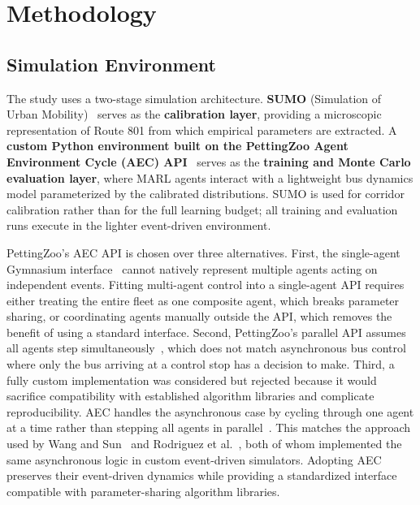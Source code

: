 \section{Methodology}

\subsection{Simulation Environment}

The study uses a two-stage simulation architecture. \textbf{SUMO} (Simulation of Urban Mobility)~\cite{Lopez2018SUMO} serves as the \textbf{calibration layer}, providing a microscopic representation of Route 801 from which empirical parameters are extracted. A \textbf{custom Python environment built on the PettingZoo Agent Environment Cycle (AEC) API}~\cite{Terry2021PettingZoo} serves as the \textbf{training and Monte Carlo evaluation layer}, where MARL agents interact with a lightweight bus dynamics model parameterized by the calibrated distributions. SUMO is used for corridor calibration rather than for the full learning budget; all training and evaluation runs execute in the lighter event-driven environment.

PettingZoo's AEC API is chosen over three alternatives. First, the single-agent Gymnasium interface~\cite{Towers2024Gymnasium} cannot natively represent multiple agents acting on independent events. Fitting multi-agent control into a single-agent API requires either treating the entire fleet as one composite agent, which breaks parameter sharing, or coordinating agents manually outside the API, which removes the benefit of using a standard interface. Second, PettingZoo's parallel API assumes all agents step simultaneously~\cite{Terry2021PettingZoo}, which does not match asynchronous bus control where only the bus arriving at a control stop has a decision to make. Third, a fully custom implementation was considered but rejected because it would sacrifice compatibility with established algorithm libraries and complicate reproducibility. AEC handles the asynchronous case by cycling through one agent at a time rather than stepping all agents in parallel~\cite{Terry2021PettingZoo}. This matches the approach used by Wang and Sun~\cite{Wangsun} and Rodriguez et al.~\cite{Rodriguez2023Cooperative}, both of whom implemented the same asynchronous logic in custom event-driven simulators. Adopting AEC preserves their event-driven dynamics while providing a standardized interface compatible with parameter-sharing algorithm libraries.

